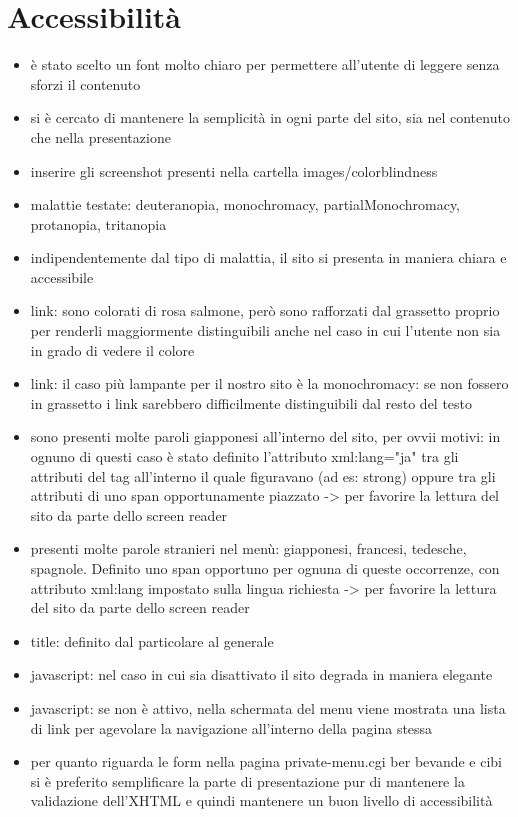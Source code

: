 \documentclass[../relazione.tex]{subfiles}
\begin{document}
\section{Accessibilità}
	\begin{itemize}
		\item è stato scelto un font molto chiaro per permettere all'utente di leggere senza sforzi il contenuto
		\item si è cercato di mantenere la semplicità in ogni parte del sito, sia nel contenuto che nella presentazione
		\item inserire gli screenshot presenti nella cartella images/colorblindness
		\item malattie testate: deuteranopia, monochromacy, partialMonochromacy, protanopia, tritanopia
		\item indipendentemente dal tipo di malattia, il sito si presenta in maniera chiara e accessibile
		\item link: sono colorati di rosa salmone, però sono rafforzati dal grassetto proprio per renderli maggiormente distinguibili anche nel caso in cui l'utente non sia in grado di vedere il colore
		\item link: il caso più lampante per il nostro sito è la monochromacy: se non fossero in grassetto i link sarebbero difficilmente distinguibili dal resto del testo
		\item sono presenti molte paroli giapponesi all'interno del sito, per ovvii motivi: in ognuno di questi caso è stato definito l'attributo xml:lang="ja" tra gli attributi del tag all'interno il quale figuravano (ad es: strong) oppure tra gli attributi di uno span opportunamente piazzato -> per favorire la lettura del sito da parte dello screen reader
		\item presenti molte parole stranieri nel menù: giapponesi, francesi, tedesche, spagnole. Definito uno span opportuno per ognuna di queste occorrenze, con attributo xml:lang impostato sulla lingua richiesta -> per favorire la lettura del sito da parte dello screen reader
		\item title: definito dal particolare al generale
		\item javascript: nel caso in cui sia disattivato il sito degrada in maniera elegante
		\item javascript: se non è attivo, nella schermata del menu viene mostrata una lista di link per agevolare la navigazione all'interno della pagina stessa
		\item per quanto riguarda le form nella pagina private-menu.cgi ber bevande e cibi si è preferito semplificare la parte di presentazione pur di mantenere la validazione dell’XHTML e quindi mantenere un buon livello di accessibilità

\end{itemize}
\end{document}
